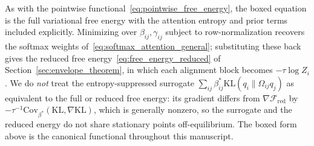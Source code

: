 \documentclass[11pt]{article}
\begin{document}
As with the pointwise functional~\eqref{eq:pointwise_free_energy}, the boxed equation is the full variational free energy with the attention entropy and prior terms included explicitly. Minimizing over $\beta_{ij}, \gamma_{ij}$ subject to row-normalization recovers the softmax weights of~\eqref{eq:softmax_attention_general}; substituting these back gives the reduced free energy~\eqref{eq:free_energy_reduced} of Section~\ref{sec:envelope_theorem}, in which each alignment block becomes $-\tau \log Z_i$. We do \emph{not} treat the entropy-suppressed surrogate $\sum_{ij} \beta^*_{ij}\mathrm{KL}(q_i \| \Omega_{ij}q_j)$ as equivalent to the full or reduced free energy: its gradient differs from $\nabla\mathcal{F}_{\mathrm{red}}$ by $-\tau^{-1}\mathrm{Cov}_{\beta^*}(\mathrm{KL}, \nabla \mathrm{KL})$, which is generally nonzero, so the surrogate and the reduced energy do not share stationary points off-equilibrium. The boxed form above is the canonical functional throughout this manuscript.
\end{document}
